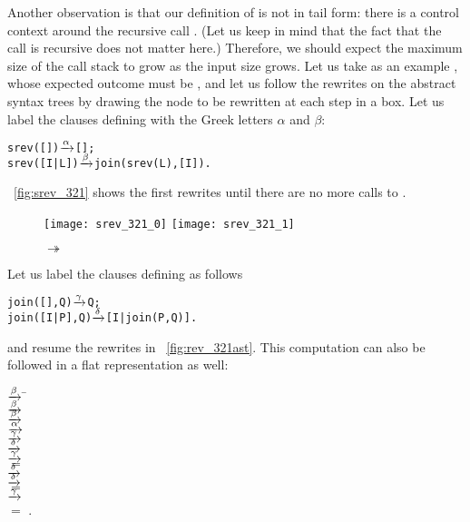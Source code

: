 Another observation is that our definition of  is not
in tail form: there is a control context
 around the recursive call
. (Let us keep in mind that the fact that the
call is recursive does not matter here.) Therefore, we should expect
the maximum size of the call stack to grow as the input size
grows. Let us take as an example , whose
expected outcome must be \erlcode{[1,2,3]}, and let us follow the
rewrites on the abstract syntax trees by drawing the node to be
rewritten at each step in a box. Let us label the clauses defining
 with the Greek letters \(\alpha\) and \(\beta\):
\begin{alltt}
srev(   []) \(\smashedrightarrow{\alpha}\) [];
srev([I|L]) \(\smashedrightarrow{\beta}\) join(srev(L),[I]).
\end{alltt}
\Fig~\vref{fig:srev_321} shows the first rewrites until there are no
more calls to .
\begin{figure}[t]
\centering
\texttt{[image: srev\_321\_0]}
\texttt{[image: srev\_321\_1]}
\caption{ \(\twoheadrightarrow\)
\label{fig:srev_321}}
\end{figure}
Let us label the clauses defining  as follows
\begin{alltt}
join(   [],Q) \(\smashedrightarrow{\gamma}\) Q;
join([I|P],Q) \(\smashedrightarrow{\delta}\) [I|join(P,Q)].
\end{alltt}
and resume the rewrites in \fig~\vref{fig:rev_321ast}.  This
computation can also be followed in a flat representation as
well:\label{rev_321bis}
\begin{tabbing}
 \= \(\xrightarrow{\smash{\beta}}\) \= \\
  \> \(\xrightarrow{\smash{\beta}}\) \> \\
  \> \(\xrightarrow{\smash{\beta}}\) \>
                \\
  \> \(\xrightarrow{\smash{\alpha}}\) \>
                \\
  \> \(\xrightarrow{\smash{\gamma}}\) \> \\
  \> \(\xrightarrow{\smash{\delta}}\) \> \\
  \> \(\xrightarrow{\smash{\gamma}}\) \> \\
  \> \(=\)               \> \\
  \> \(\xrightarrow{\smash{\delta}}\) \> \erlcode{[1|join([2],[3])]}\\
  \> \(\xrightarrow{\smash{\delta}}\) \> \\
  \> \(=\)               \> \erlcode{[1,2|join([],[3])]}\\
  \> \(\xrightarrow{\smash{\gamma}}\) \> \erlcode{[1,2|[3]]}\\
  \> \(=\)               \> \erlcode{[1,2,3]}\textrm{.}
\end{tabbing}
